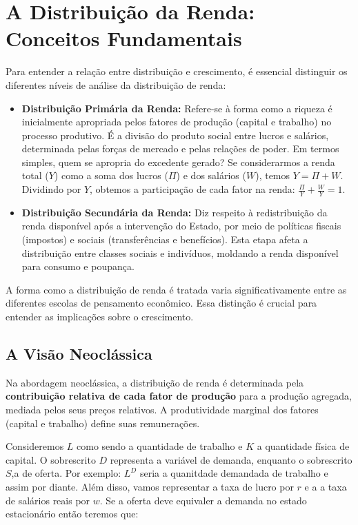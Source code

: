 \documentclass[
  brazilian,
  letterpaper,
  DIV=11,
  numbers=noendperiod]{scrreprt}
\begin{document}
\section{A Distribuição da Renda: Conceitos
Fundamentais}\label{a-distribuiuxe7uxe3o-da-renda-conceitos-fundamentais}

Para entender a relação entre distribuição e crescimento, é essencial
distinguir os diferentes níveis de análise da distribuição de renda:

\begin{itemize}
\item
  \textbf{Distribuição Primária da Renda:} Refere-se à forma como a
  riqueza é inicialmente apropriada pelos fatores de produção (capital e
  trabalho) no processo produtivo. É a divisão do produto social entre
  lucros e salários, determinada pelas forças de mercado e pelas
  relações de poder. Em termos simples, quem se apropria do excedente
  gerado? Se considerarmos a renda total (\(Y\)) como a soma dos lucros
  (\(\Pi\)) e dos salários (\(W\)), temos \(Y = \Pi + W\). Dividindo por
  \(Y\), obtemos a participação de cada fator na renda:
  \(\frac{\Pi}{Y} + \frac{W}{Y} = 1\).
\item
  \textbf{Distribuição Secundária da Renda:} Diz respeito à
  redistribuição da renda disponível após a intervenção do Estado, por
  meio de políticas fiscais (impostos) e sociais (transferências e
  benefícios). Esta etapa afeta a distribuição entre classes sociais e
  indivíduos, moldando a renda disponível para consumo e poupança.
\end{itemize}

A forma como a distribuição de renda é tratada varia significativamente
entre as diferentes escolas de pensamento econômico. Essa distinção é
crucial para entender as implicações sobre o crescimento.

\subsection{A Visão Neoclássica}\label{a-visuxe3o-neocluxe1ssica}

Na abordagem neoclássica, a distribuição de renda é determinada pela
\textbf{contribuição relativa de cada fator de produção} para a produção
agregada, mediada pelos seus preços relativos. A produtividade marginal
dos fatores (capital e trabalho) define suas remunerações.

Consideremos \(L\) como sendo a quantidade de trabalho e \(K\) a
quantidade física de capital. O sobrescrito \(D\) representa a variável
de demanda, enquanto o sobrescrito \(S\),a de oferta. Por exemplo:
\(L^D\) seria a quanitdade demandada de trabalho e assim por diante.
Além disso, vamos representar a taxa de lucro por \(r\) e a a taxa de
salários reais por \(w\). Se a oferta deve equivaler a demanda no estado
estacionário então teremos que:
\end{document}
